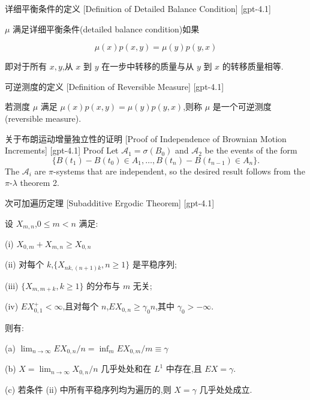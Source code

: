 \documentclass[UTF8]{ctexart}
\begin{document}
    
    
    \begin{dfn}
        {详细平衡条件的定义}
        [Definition of Detailed Balance Condition]
        [gpt-4.1]
        
$\mu$ 满足详细平衡条件(detailed balance condition)如果

\[
\mu ( x ) p ( x , y ) = \mu ( y ) p ( y , x )
\]

即对于所有 $x, y$,从 $x$ 到 $y$ 在一步中转移的质量与从 $y$ 到 $x$ 的转移质量相等.

    \end{dfn}
    
    
    
    \begin{dfn}
        {可逆测度的定义}
        [Definition of Reversible Measure]
        [gpt-4.1]
        
若测度 $\mu$ 满足 $\mu(x)p(x, y) = \mu(y)p(y, x)$,则称 $\mu$ 是一个可逆测度(reversible measure).

    \end{dfn}
    
    
    
    \begin{prf}
        {关于布朗运动增量独立性的证明}
        [Proof of Independence of Brownian Motion Increments]
        [gpt-4.1]
        Proof Let $\mathcal{A}_1 = \sigma(B_0)$ and $\mathcal{A}_2$ be the events of the form
\[
\{B(t_1) - B(t_0) \in A_1, \ldots, B(t_n) - B(t_{n-1}) \in A_n\}.
\]
The $\mathcal{A}_i$ are $\pi$-systems that are independent, so the desired result follows from the $\pi$-$\lambda$ theorem 2.
    \end{prf}
    
    
    
    \begin{thm}
        {次可加遍历定理}
        [Subadditive Ergodic Theorem]
        [gpt-4.1]
        
设 $X_{m, n}$,$0 \leq m < n$ 满足:

(i) $X_{0, m} + X_{m, n} \geq X_{0, n}$

(ii) 对每个 $k$,$\{ X_{nk, (n+1)k}, n \geq 1 \}$ 是平稳序列;

(iii) $\{ X_{m, m+k}, k \geq 1 \}$ 的分布与 $m$ 无关;

(iv) $E X_{0, 1}^{+} < \infty$,且对每个 $n$,$E X_{0, n} \geq \gamma_{0} n$,其中 $\gamma_{0} > -\infty$.

则有:

(a) $\lim_{n \to \infty} E X_{0, n} / n = \inf_{m} E X_{0, m} / m \equiv \gamma$

(b) $X = \lim_{n \to \infty} X_{0, n} / n$ 几乎处处和在 $L^{1}$ 中存在,且 $E X = \gamma$.

(c) 若条件 (ii) 中所有平稳序列均为遍历的,则 $X = \gamma$ 几乎处处成立.

    \end{thm}
    
\end{document}
